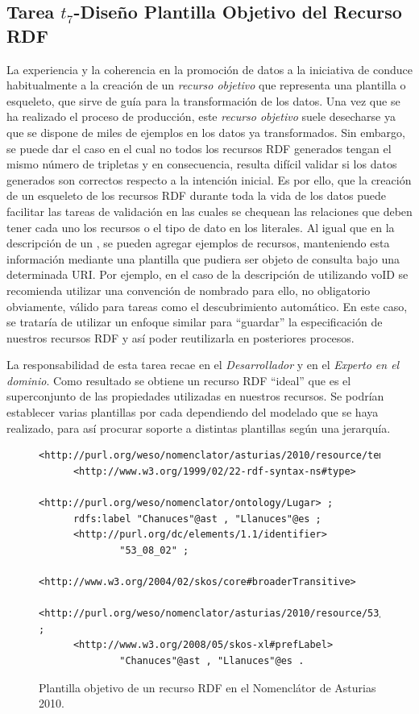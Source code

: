 \subsection{Tarea $t_7$-Diseño Plantilla Objetivo del Recurso RDF}
La experiencia y la coherencia en la promoción de datos a la iniciativa de \linkeddata conduce
habitualmente a la creación de un \textit{recurso objetivo} que representa una plantilla o esqueleto, que sirve
de guía para la transformación de los datos. Una vez que se ha realizado el proceso de producción, 
este \textit{recurso objetivo} suele desecharse ya que se dispone de miles de ejemplos en los datos ya 
transformados. Sin embargo, se puede dar el caso en el cual no todos los recursos RDF generados tengan
el mismo número de tripletas y en consecuencia, resulta difícil validar si los datos generados son correctos respecto a la 
intención inicial. Es por ello, que la creación de un esqueleto de los recursos RDF durante toda la vida
de los datos puede facilitar las tareas de validación en las cuales se chequean las relaciones que deben
tener cada uno los recursos o el tipo de dato en los literales. Al igual que en la descripción
de un \dataset, se pueden agregar ejemplos de recursos, manteniendo esta
información mediante una plantilla que pudiera ser objeto de consulta bajo una determinada URI. Por ejemplo, 
en el caso de la descripción de \datasets utilizando \gls{voID} se recomienda utilizar una convención 
de nombrado para ello, no obligatorio obviamente, válido para tareas como el descubrimiento
automático. En este caso, se trataría de utilizar un enfoque similar para ``guardar'' la especificación
de nuestros recursos \gls{RDF} y así poder reutilizarla en posteriores procesos.


La responsabilidad de esta tarea recae en el \textit{Desarrollador} y en el \textit{Experto en el dominio}. Como resultado se obtiene un 
recurso RDF ``ideal'' que es el superconjunto de las propiedades utilizadas en nuestros recursos. Se podrían establecer 
varias plantillas por cada \dataset dependiendo del modelado que se haya realizado, para así procurar soporte a distintas plantillas según una jerarquía.

\begin{figure}[!htp]
\begin{lstlisting} 
<http://purl.org/weso/nomenclator/asturias/2010/resource/template>
      <http://www.w3.org/1999/02/22-rdf-syntax-ns#type>
              <http://purl.org/weso/nomenclator/ontology/Lugar> ;
      rdfs:label "Chanuces"@ast , "Llanuces"@es ;
      <http://purl.org/dc/elements/1.1/identifier>
              "53_08_02" ;
      <http://www.w3.org/2004/02/skos/core#broaderTransitive>
              <http://purl.org/weso/nomenclator/asturias/2010/resource/53/08/00> ;
      <http://www.w3.org/2008/05/skos-xl#prefLabel>
              "Chanuces"@ast , "Llanuces"@es .
\end{lstlisting}
	\caption{Plantilla objetivo de un recurso RDF en el Nomenclátor de Asturias 2010.}
	\label{fig:modelo-nomen-template}
\end{figure}

